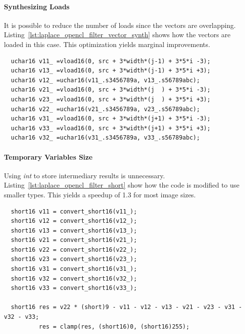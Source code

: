 \documentclass{IEEEtran}
\begin{document}
\paragraph{Synthesizing Loads} It is possible to reduce the number of loads
since the vectors are overlapping.
Listing~\ref{lst:laplace_opencl_filter_vector_synth} shows how the vectors are
loaded in this case. This optimization yields marginal improvements.

\begin{lstlisting}
  uchar16 v11_ =vload16(0, src + 3*width*(j-1) + 3*5*i -3);
  uchar16 v13_ =vload16(0, src + 3*width*(j-1) + 3*5*i +3);
  uchar16 v12_ =uchar16(v11_.s3456789a, v13_.s56789abc);
  uchar16 v21_ =vload16(0, src + 3*width*(j  ) + 3*5*i -3);
  uchar16 v23_ =vload16(0, src + 3*width*(j  ) + 3*5*i +3);
  uchar16 v22_ =uchar16(v21_.s3456789a, v23_.s56789abc);
  uchar16 v31_ =vload16(0, src + 3*width*(j+1) + 3*5*i -3);
  uchar16 v33_ =vload16(0, src + 3*width*(j+1) + 3*5*i +3);
  uchar16 v32_ =uchar16(v31_.s3456789a, v33_.s56789abc);
\end{lstlisting}

\paragraph{Temporary Variables Size} Using \emph{int} to store intermediary
results is unnecessary. Listing~\ref{lst:laplace_opencl_filter_short} show how
the code is modified to use smaller types. This yields a speedup of 1.3 for
most image sizes.

\begin{lstlisting}
  short16 v11 = convert_short16(v11_);
  short16 v12 = convert_short16(v12_);
  short16 v13 = convert_short16(v13_);
  short16 v21 = convert_short16(v21_);
  short16 v22 = convert_short16(v22_);
  short16 v23 = convert_short16(v23_);
  short16 v31 = convert_short16(v31_);
  short16 v32 = convert_short16(v32_);
  short16 v33 = convert_short16(v33_);

  short16 res = v22 * (short)9 - v11 - v12 - v13 - v21 - v23 - v31 - v32 - v33;
          res = clamp(res, (short16)0, (short16)255);
\end{lstlisting}
\end{document}
